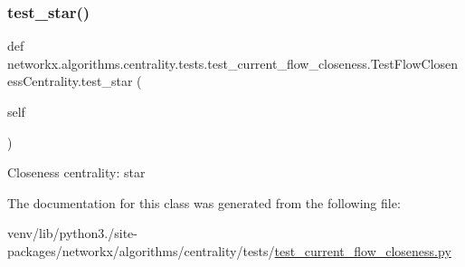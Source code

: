 \subsubsection{\texorpdfstring{test\+\_\+star()}{test\_star()}}
{\footnotesize\ttfamily def networkx.\+algorithms.\+centrality.\+tests.\+test\+\_\+current\+\_\+flow\+\_\+closeness.\+Test\+Flow\+Closeness\+Centrality.\+test\+\_\+star (\begin{DoxyParamCaption}\item[{}]{self }\end{DoxyParamCaption})}

\begin{DoxyVerb}Closeness centrality: star\end{DoxyVerb}
 

The documentation for this class was generated from the following file\+:\begin{DoxyCompactItemize}
\item 
venv/lib/python3./site-\/packages/networkx/algorithms/centrality/tests/\hyperlink{test__current__flow__closeness_8py}{test\+\_\+current\+\_\+flow\+\_\+closeness.\+py}\end{DoxyCompactItemize}
